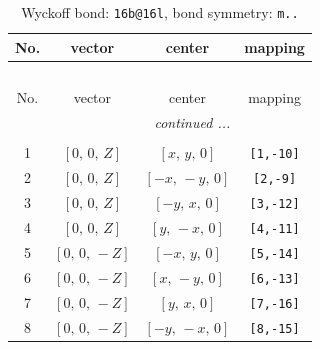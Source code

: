 \documentclass[fleqn,8pt]{jsarticle}
\begin{document}
\begin{longtable}{cccc}
\caption{Wyckoff bond: {\tt 16b@16l}, bond symmetry: {\tt m..}}
 \\
 \hline \hline
No. & vector & center & mapping \\ \hline \endfirsthead

\multicolumn{3}{l}{\tablename\ \thetable{}} \\
 \hline \hline
No. & vector & center & mapping \\ \hline \endhead

 \hline \hline
\multicolumn{3}{r}{\footnotesize\it continued ...} \\ \endfoot

 \hline \hline
\multicolumn{3}{r}{} \\ \endlastfoot

1 & $\left[ 0,\, 0,\, Z \right]$ & $\left[ x,\, y,\, 0 \right]$ & {\tt [1,-10]} \\ \hline
2 & $\left[ 0,\, 0,\, Z \right]$ & $\left[ - x,\, - y,\, 0 \right]$ & {\tt [2,-9]} \\ \hline
3 & $\left[ 0,\, 0,\, Z \right]$ & $\left[ - y,\, x,\, 0 \right]$ & {\tt [3,-12]} \\ \hline
4 & $\left[ 0,\, 0,\, Z \right]$ & $\left[ y,\, - x,\, 0 \right]$ & {\tt [4,-11]} \\ \hline
5 & $\left[ 0,\, 0,\, - Z \right]$ & $\left[ - x,\, y,\, 0 \right]$ & {\tt [5,-14]} \\ \hline
6 & $\left[ 0,\, 0,\, - Z \right]$ & $\left[ x,\, - y,\, 0 \right]$ & {\tt [6,-13]} \\ \hline
7 & $\left[ 0,\, 0,\, - Z \right]$ & $\left[ y,\, x,\, 0 \right]$ & {\tt [7,-16]} \\ \hline
8 & $\left[ 0,\, 0,\, - Z \right]$ & $\left[ - y,\, - x,\, 0 \right]$ & {\tt [8,-15]} \\
\end{longtable}
\renewcommand{\arraystretch}{1.2}
\end{document}
